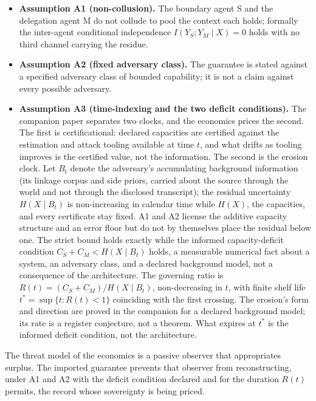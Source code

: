 \documentclass[
  11pt,
]{article}
\providecommand{\tightlist}{%
  \setlength{\itemsep}{0pt}\setlength{\parskip}{0pt}}
\begin{document}
\begin{itemize}
\tightlist
\item
  \textbf{Assumption A1 (non-collusion).} The boundary agent S and the
  delegation agent M do not collude to pool the context each holds;
  formally the inter-agent conditional independence
  \(I(Y_S; Y_M \mid X) = 0\) holds with no third channel carrying the
  residue.
\item
  \textbf{Assumption A2 (fixed adversary class).} The guarantee is
  stated against a specified adversary class of bounded capability; it
  is not a claim against every possible adversary.
\item
  \textbf{Assumption A3 (time-indexing and the two deficit conditions).}
  The companion paper separates two clocks, and the economics prices the
  second. The first is certificational: declared capacities are
  certified against the estimation and attack tooling available at time
  \(t\), and what drifts as tooling improves is the certified value, not
  the information. The second is the erosion clock. Let \(B_t\) denote
  the adversary's accumulating background information (its linkage
  corpus and side priors, carried about the source through the world and
  not through the disclosed transcript); the residual uncertainty
  \(H(X \mid B_t)\) is non-increasing in calendar time while \(H(X)\),
  the capacities, and every certificate stay fixed. A1 and A2 license
  the additive capacity structure and an error floor but do not by
  themselves place the residual below one. The strict bound holds
  exactly while the informed capacity-deficit condition
  \(C_S + C_M < H(X \mid B_t)\) holds, a measurable numerical fact about
  a system, an adversary class, and a declared background model, not a
  consequence of the architecture. The governing ratio is
  \(R(t) = (C_S + C_M)/H(X \mid B_t)\), non-decreasing in \(t\), with
  finite shelf life \(t^{*} = \sup\{t : R(t) < 1\}\) coinciding with the
  first crossing. The erosion's form and direction are proved in the
  companion for a declared background model; its rate is a register
  conjecture, not a theorem. What expires at \(t^{*}\) is the informed
  deficit condition, not the architecture.
\end{itemize}

The threat model of the economics is a passive observer that
appropriates surplus. The imported guarantee prevents that observer from
reconstructing, under A1 and A2 with the deficit condition declared and
for the duration \(R(t)\) permits, the record whose sovereignty is being
priced.
\end{document}
